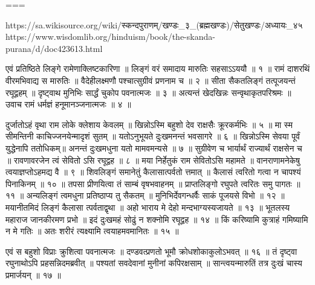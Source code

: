 ===

https://sa.wikisource.org/wiki/स्कन्दपुराणम्/खण्डः_३_(ब्रह्मखण्डः)/सेतुखण्डः/अध्यायः_४५
https://www.wisdomlib.org/hinduism/book/the-skanda-purana/d/doc423613.html


एवं प्रतिष्ठिते लिङ्गे रामेणाक्लिष्टकारिणा ॥
लिङ्गं वरं समादाय मारुतिः सहसाऽऽययौ ॥ १ ॥
रामं दाशरथिं वीरमभिवाद्य स मारुतिः ॥
वैदेहीलक्ष्मणौ पश्चात्सुग्रीवं प्रणनाम च ॥ २ ॥
सीता सैकतलिङ्गं तत्पूजयन्तं रघूद्वहम् ॥
दृष्ट्वाथ मुनिभिः सार्द्धं चुकोप पवनात्मजः ॥ ३ ॥
अत्यन्तं खेदखिन्नः सन्वृथाकृतपरिश्रमः ॥
उवाच रामं धर्मज्ञं हनूमानञ्जनात्मजः ॥ ४ ॥

दुर्जातोऽहं वृथा राम लोके क्लेशाय केवलम् ॥
खिन्नोऽस्मि बहुशो देव राक्षसैः क्रूरकर्मभिः ॥ ५ ॥
मा स्म सीमन्तिनी काचिज्जनयेन्मादृशं सुतम् ॥
यतोऽनुभूयते दुःखमनन्तं भवसागरे ॥ ६ ॥
खिन्नोऽस्मि सेवया पूर्वं युद्धेनापि ततोधिकम्॥
अनन्तं दुःखमधुना यतो मामवमन्यसे ॥ ७ ॥
सुग्रीवेण च भार्यार्थं राज्यार्थं राक्षसेन च ॥
रावणावरजेन त्वं सेवितो ऽसि रघूद्वह ॥ ८ ॥
मया निर्हेतुकं राम सेवितोऽसि महामते ॥
वानराणामनेकेषु त्वयाज्ञप्तोऽहमद्य वै ॥ ९ ॥
शिवलिङ्गं समानेतुं कैलासात्पर्वतो त्तमात् ॥
कैलासं त्वरितो गत्वा न चापश्यं पिनाकिनम् ॥ १० ॥
तपसा प्रीणयित्वा तं साम्बं वृषभवाहनम् ॥
प्राप्तलिङ्गो रघुपते त्वरितः समु पागतः ॥ ११ ॥
अन्यलिङ्गं त्वमधुना प्रतिष्ठाप्य तु सैकतम् ॥
मुनिभिर्देवगन्धर्वैः साकं पूजयसे विभो ॥ १२ ॥
मयानीतमिदं लिङ्गं कैलासा त्पर्वताद्वृथा ॥
अहो भाराय मे देहो मन्दभाग्यस्यजायते ॥ १३ ॥
भूतलस्य महाराज जानकीरमण प्रभो ॥
इदं दुःखमहं सोढुं न शक्नोमि रघूद्वह ॥ १४ ॥
किं करिष्यामि कुत्राहं गमिष्यामि न मे गतिः ॥
अतः शरीरं त्यक्ष्यामि त्वयाहमवमानितः ॥ १५ ॥

एवं स बहुशो विप्राः क्रुशित्वा पवनात्मजः ॥
दण्डवत्प्रणतो भूमौ क्रोधशोकाकुलोऽभवत् ॥ १६ ॥
तं दृष्ट्वा रघुनाथोऽपि प्रहसन्निदमब्रवीत् ॥
पश्यतां सवदेवानां मुनीनां कपिरक्षसाम् ॥
सान्त्वयन्मारुतिं तत्र दुःखं चास्य प्रमार्जयन् ॥ १७ ॥

